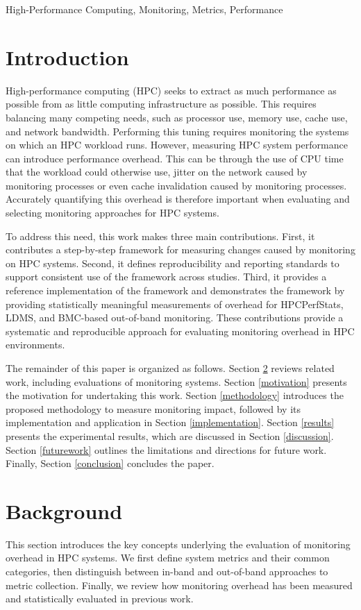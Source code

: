\documentclass[conference]{IEEEtran}
\begin{document}
\begin{IEEEkeywords}
High-Performance Computing, Monitoring, Metrics, Performance
\end{IEEEkeywords}

\section{Introduction} \label{introduction}
High-performance computing (HPC) seeks to extract as much performance as possible from as little computing infrastructure as possible. This requires balancing many competing needs, such as processor use, memory use, cache use, and network bandwidth.
Performing this tuning requires monitoring the systems on which an HPC workload
runs. However, measuring HPC system performance can introduce performance overhead. This can be through the 
use of CPU time that the workload could otherwise use, jitter on the network 
caused by monitoring processes or even cache invalidation caused by
monitoring processes. Accurately quantifying this overhead is therefore important when evaluating and selecting monitoring approaches for HPC systems.

To address this need, this work makes three main contributions. First, it contributes a step-by-step framework for measuring changes caused by monitoring on HPC systems. Second, it defines reproducibility and reporting standards to support consistent use of the framework across studies. Third, it provides a reference implementation of the framework and demonstrates the framework by providing statistically meaningful measurements of overhead for 
HPCPerfStats, LDMS, and BMC-based out-of-band monitoring. These contributions provide a systematic and reproducible approach for evaluating monitoring overhead in HPC environments.

The remainder of this paper is organized as follows. Section \ref{background} reviews related work, including evaluations of monitoring systems. Section \ref{motivation} presents the motivation for undertaking this 
work. Section \ref{methodology} introduces the proposed methodology to measure monitoring 
impact, followed by its implementation and application in Section \ref{implementation}. Section \ref{results} presents the experimental results, which are discussed in Section \ref{discussion}. Section \ref{futurework} outlines the limitations and directions for future work. Finally, Section \ref{conclusion} concludes the paper.

\section{Background} \label{background}
This section introduces the key concepts underlying the evaluation of monitoring overhead in HPC systems. 
We first define system metrics and their common categories, then distinguish between in-band and out-of-band approaches to metric collection. 
Finally, we review how monitoring overhead has been measured and statistically evaluated in previous work.
\end{document}
